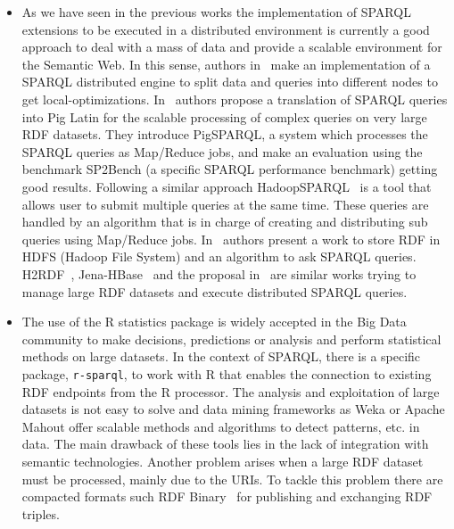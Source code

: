 \begin{itemize}
\item As we have seen in the previous works the implementation of SPARQL 
extensions to be executed in a distributed environment is currently a good 
approach to deal with a mass of data and provide a scalable environment for the 
Semantic Web. In this sense, authors in~\cite{DBLP:journals/pvldb/HuangAR11} make an implementation of a SPARQL 
distributed engine to split data and queries into different nodes to get 
local-optimizations. In~\cite{Schatzle:2011:PMS:1999299.1999303} authors propose a translation of SPARQL queries 
into Pig Latin for the scalable processing of complex queries on very large RDF 
datasets. They introduce PigSPARQL, a system which processes the SPARQL queries 
as Map/Reduce jobs, and make an evaluation using the benchmark SP2Bench (a 
specific SPARQL performance benchmark) getting good results. Following a similar 
approach HadoopSPARQL~\cite{liuhadoopsparql} is a tool that allows user to submit multiple queries 
at the same time. These queries are handled by an algorithm that is in charge of 
creating and distributing sub queries using Map/Reduce jobs. In~\cite{FarhanHusain:2009:SRL:1695659.1695734} authors 
present a work to store RDF in HDFS (Hadoop File System) and an algorithm to ask 
SPARQL queries. H2RDF~\cite{Papailiou:2012:HAQ:2187980.2188058}, Jena-HBase~\cite{DBLP:conf/semweb/KhadilkarKTC12} and the proposal in~\cite{maindonald2007data} 
are similar works trying to manage large RDF datasets and execute distributed SPARQL queries. 

\item The use of the R statistics package is widely accepted in the Big 
Data community to make decisions, predictions or analysis and perform statistical methods on large datasets. In 
the context of SPARQL, there is a specific package, \texttt{r-sparql}, to work with R that enables the 
connection to existing RDF endpoints from the R processor. The analysis and exploitation of large datasets is not easy to solve and data 
mining frameworks as Weka or Apache Mahout offer scalable methods and algorithms 
to detect patterns, etc. in data. The main drawback of these tools lies in the 
lack of integration with semantic technologies. Another problem arises when a 
large RDF dataset must be processed, mainly due to the URIs. To tackle this 
problem there are compacted formats such RDF Binary~\cite{DBLP:journals/ws/FernandezMGPA13} for publishing and exchanging RDF triples.



\end{itemize}

